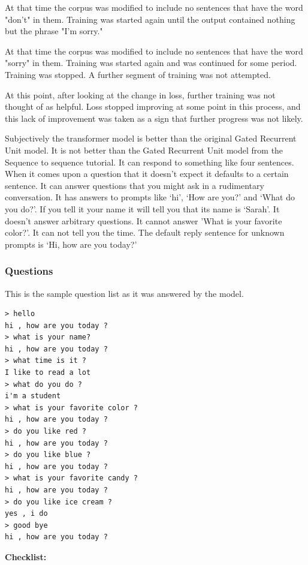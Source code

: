 At that time the corpus was modified to include no 
sentences that have the word "don't" in them. Training was started again until the output contained nothing but the phrase "I'm sorry." 

At that time the corpus was modified to include no sentences that have the word "sorry" in them. Training was started again and was continued for some period. Training was stopped. A further segment of training was not attempted. 

At this point, after looking at the change in loss, further training was not thought of as helpful. Loss stopped improving at some point in this process, and this lack of improvement was taken as a sign that further progress was not likely.

Subjectively the transformer model is better than the original Gated Recurrent Unit model. It is not better than the Gated Recurrent Unit model from the Sequence to sequence tutorial. It can respond to something like four sentences. When it comes upon a question that it doesn't expect it defaults to a certain sentence. It can answer questions that you might ask in a rudimentary conversation. It has answers to prompts like `hi', `How are you?' and `What do you do?'. If you tell it your name it will tell you that its name is `Sarah'. It doesn't answer arbitrary questions. It cannot answer 'What is your favorite color?'. It can not tell you the time. The default reply sentence for unknown prompts is `Hi, how are you today?'

\subsubsection*{Questions}
This is the sample question list as it was answered by the model.

\begin{verbatim}
> hello
hi , how are you today ?
> what is your name?
hi , how are you today ?
> what time is it ?
I like to read a lot
> what do you do ?
i'm a student
> what is your favorite color ?
hi , how are you today ?
> do you like red ?
hi , how are you today ?
> do you like blue ?
hi , how are you today ?
> what is your favorite candy ?
hi , how are you today ?
> do you like ice cream ?
yes , i do 
> good bye
hi , how are you today ?
\end{verbatim}

\noindent \textbf{Checklist:} 

